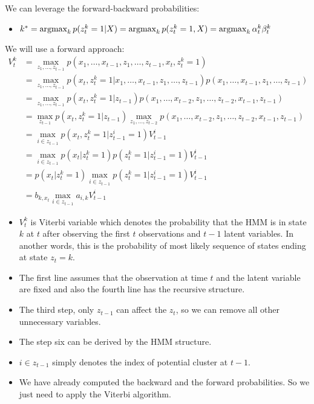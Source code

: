 We can leverage the forward-backward probabilities:
\begin{itemize}
	\item $k^* = \operatorname*{\operatorname{argmax}}_{k}p(z_t^k=1|X) = \operatorname*{\operatorname{argmax}}_{k}p(z^k_t=1,X) = \operatorname*{\operatorname{argmax}}_{k}\alpha_{t}^k\beta_{t}^k$
\end{itemize}
We will use a forward approach:
\begin{align}
	V_t^k &= \max_{z_1,\dots,z_{t-1}}p(x_1,\dots,x_{t-1},z_1,\dots,z_{t-1},x_t,z_t^k=1)\\ 
	& = \max_{z_1,\dots,z_{t-1}}p(x_t,z_t^k=1|x_1,\dots,x_{t-1},z_1,\dots,z_{t-1})p(x_1,\dots,x_{t-1},z_1,\dots,z_{t-1})\\
	& = \max_{z_1,\dots,z_{t-1}}p(x_t,z_t^k=1|z_{t-1})p(x_1,\dots,x_{t-2},z_1,\dots,z_{t-2}, x_{t-1}, z_{t-1})\\
	& = \max_{z_{t-1}}p(x_t,z_t^k=1|z_{t-1})\max_{z_1,\dots,z_{t-2}}p(x_1,\dots,x_{t-2},z_1,\dots,z_{t-2}, x_{t-1}, z_{t-1})\\
	& = \max_{i\in z_{t-1}}p(x_t,z_t^k=1|z_{t-1}^i=1)V_{t-1}^i\\
	& = \max_{i\in z_{t-1}}p(x_t|z_t^k=1)p(z_t^k=1|z_{t-1}^i=1)V_{t-1}^i\\
	& = p(x_t|z_t^k=1)\max_{i\in z_{t-1}}p(z_t^k=1|z_{t-1}^i=1)V_{t-1}^i\\
	& = b_{k,x_t}\max_{i\in z_{t-1}}a_{i,k}V_{t-1}^i
\end{align}
\begin{itemize}
	\item $V_{t}^k$ is Viterbi variable which denotes the probability that the HMM is in state $k$ at $t$ after observing the first $t$ observations and $t-1$ latent variables. In another words, this is the probability of most likely sequence of states ending at state $z_t=k$.
	\item The first line assumes that the observation at time $t$ and the latent variable are fixed and also the fourth line has the recursive structure.
	\item The third step, only $z_{t-1}$ can affect the $z_{t}$, so we can remove all other unnecessary variables.
	\item The step six can be derived by the HMM structure. 
	\item $i\in z_{t-1}$ simply denotes the index of potential cluster at $t-1$.
	\item We have already computed the backward and the forward probabilities. So we just need to apply the Viterbi algorithm. 
\end{itemize}

